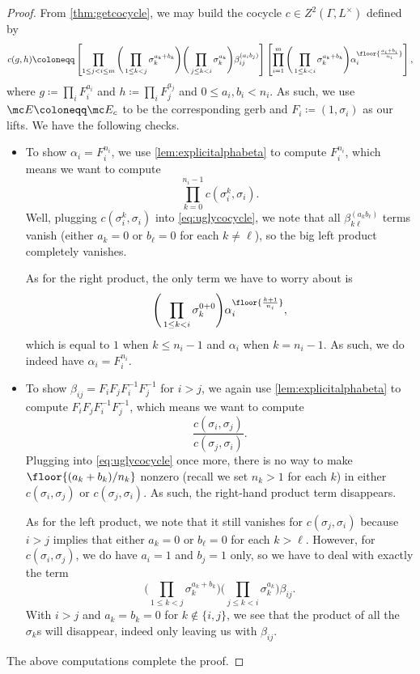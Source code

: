\documentclass{article}
\numberwithin{equation}{section}
\begin{document}
\begin{proof}
	From \autoref{thm:getcocycle}, we may build the cocycle $c\in Z^2(\Gamma,L^\times)$ defined by
	\begin{equation}
		c(g,h)\coloneqq\left[\prod_{1\le j<i\le m}\Bigg(\prod_{1\le k<j}\sigma_k^{a_k+b_k}\Bigg)\Bigg(\prod_{j\le k<i}\sigma_k^{a_k}\Bigg)\beta_{ij}^{(a_ib_j)}\right]\left[\prod_{i=1}^m\Bigg(\prod_{1\le k<i}\sigma_k^{a_k+b_k}\Bigg)\alpha_i^{\floor{\frac{a_i+b_i}{n_i}}}\right], \label{eq:uglycocycle}
	\end{equation}
	where $g\coloneqq\prod_iF_i^{a_i}$ and $h\coloneqq\prod_iF_j^{a_j}$ and $0\le a_i,b_i<n_i$. As such, we use $\mc E\coloneqq\mc E_c$ to be the corresponding gerb and $F_i\coloneqq(1,\sigma_i)$ as our lifts. We have the following checks.
	\begin{itemize}
		\item To show $\alpha_i=F_i^{n_i}$, we use \autoref{lem:explicitalphabeta} to compute $F_i^{n_i}$, which means we want to compute
		\[\prod_{k=0}^{n_i-1}c\left(\sigma_i^k,\sigma_i\right).\]
		Well, plugging $c\left(\sigma_i^k,\sigma_i\right)$ into \autoref{eq:uglycocycle}, we note that all $\beta_{k\ell}^{(a_kb_\ell)}$ terms vanish (either $a_k=0$ or $b_\ell=0$ for each $k\ne\ell$), so the big left product completely vanishes.
		
		As for the right product, the only term we have to worry about is
		\[\Bigg(\prod_{1\le k<i}\sigma_k^{0+0}\Bigg)\alpha_i^{\floor{\frac{k+1}{n_i}}},\]
		which is equal to $1$ when $k\le n_i-1$ and $\alpha_i$ when $k=n_i-1$. As such, we do indeed have $\alpha_i=F_i^{n_i}$.
		\item To show $\beta_{ij}=F_iF_jF_i^{-1}F_j^{-1}$ for $i>j$, we again use \autoref{lem:explicitalphabeta} to compute $F_iF_jF_i^{-1}F_j^{-1}$, which means we want to compute
		\[\frac{c(\sigma_i,\sigma_j)}{c(\sigma_j,\sigma_i)}.\]
		Plugging into \autoref{eq:uglycocycle} once more, there is no way to make $\floor{(a_k+b_k)/n_k}$ nonzero (recall we set $n_k>1$ for each $k$) in either $c(\sigma_i,\sigma_j)$ or $c(\sigma_j,\sigma_i)$. As such, the right-hand product term disappears.

		As for the left product, we note that it still vanishes for $c(\sigma_j,\sigma_i)$ because $i>j$ implies that either $a_k=0$ or $b_\ell=0$ for each $k>\ell$. However, for $c(\sigma_i,\sigma_j)$, we do have $a_i=1$ and $b_j=1$ only, so we have to deal with exactly the term
		\[\Bigg(\prod_{1\le k<j}\sigma_k^{a_k+b_k}\Bigg)\Bigg(\prod_{j\le k<i}\sigma_k^{a_k}\Bigg)\beta_{ij}.\]
		With $i>j$ and $a_k=b_k=0$ for $k\notin\{i,j\}$, we see that the product of all the $\sigma_k$s will disappear, indeed only leaving us with $\beta_{ij}$.
	\end{itemize}
	The above computations complete the proof.
\end{proof}
\end{document}
